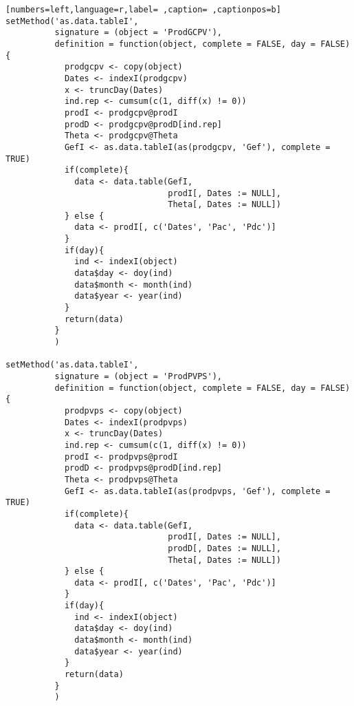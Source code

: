 \begin{lstlisting}[numbers=left,language=r,label= ,caption= ,captionpos=b]
setMethod('as.data.tableI',
          signature = (object = 'ProdGCPV'),
          definition = function(object, complete = FALSE, day = FALSE){
            prodgcpv <- copy(object)
            Dates <- indexI(prodgcpv)
            x <- truncDay(Dates)
            ind.rep <- cumsum(c(1, diff(x) != 0))
            prodI <- prodgcpv@prodI
            prodD <- prodgcpv@prodD[ind.rep]
            Theta <- prodgcpv@Theta
            GefI <- as.data.tableI(as(prodgcpv, 'Gef'), complete = TRUE)
            if(complete){
              data <- data.table(GefI,
                                 prodI[, Dates := NULL],
                                 Theta[, Dates := NULL])
            } else {
              data <- prodI[, c('Dates', 'Pac', 'Pdc')]
            }
            if(day){
              ind <- indexI(object)
              data$day <- doy(ind)
              data$month <- month(ind)
              data$year <- year(ind)
            }
            return(data)
          }
          )

setMethod('as.data.tableI',
          signature = (object = 'ProdPVPS'),
          definition = function(object, complete = FALSE, day = FALSE){
            prodpvps <- copy(object)
            Dates <- indexI(prodpvps)
            x <- truncDay(Dates)
            ind.rep <- cumsum(c(1, diff(x) != 0))
            prodI <- prodpvps@prodI
            prodD <- prodpvps@prodD[ind.rep]
            Theta <- prodpvps@Theta
            GefI <- as.data.tableI(as(prodpvps, 'Gef'), complete = TRUE)
            if(complete){
              data <- data.table(GefI,
                                 prodI[, Dates := NULL],
                                 prodD[, Dates := NULL],
                                 Theta[, Dates := NULL])
            } else {
              data <- prodI[, c('Dates', 'Pac', 'Pdc')]
            }
            if(day){
              ind <- indexI(object)
              data$day <- doy(ind)
              data$month <- month(ind)
              data$year <- year(ind)
            }
            return(data)
          }
          )
\end{lstlisting}
